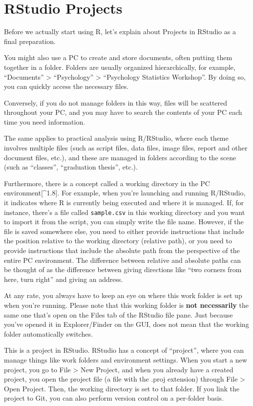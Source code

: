 \documentclass[
  a4paper,
]{book}
\begin{document}
\section{RStudio Projects}\label{rstudio-projects}

Before we actually start using R, let's explain about Projects in
RStudio as a final preparation.

You might also use a PC to create and store documents, often putting
them together in a folder. Folders are usually organized hierarchically,
for example, ``Documents'' \textgreater{} ``Psychology'' \textgreater{}
``Psychology Statistics Workshop''. By doing so, you can quickly access
the necessary files.

Conversely, if you do not manage folders in this way, files will be
scattered throughout your PC, and you may have to search the contents of
your PC each time you need information.

The same applies to practical analysis using R/RStudio, where each theme
involves multiple files (such as script files, data files, image files,
report and other document files, etc.), and these are managed in folders
according to the scene (such as ``classes'', ``graduation thesis'',
etc.).

Furthermore, there is a concept called a working directory in the PC
environment{[}\^{}1.8{]}. For example, when you're launching and running
R/RStudio, it indicates where R is currently being executed and where it
is managed. If, for instance, there's a file called \texttt{sample.csv}
in this working directory and you want to import it from the script, you
can simply write the file name. However, if the file is saved somewhere
else, you need to either provide instructions that include the position
relative to the working directory (relative path), or you need to
provide instructions that include the absolute path from the perspective
of the entire PC environment. The difference between relative and
absolute paths can be thought of as the difference between giving
directions like ``two corners from here, turn right'' and giving an
address.

At any rate, you always have to keep an eye on where this work folder is
set up when you're running. Please note that this working folder is
\textbf{not necessarily} the same one that's open on the Files tab of
the RStudio file pane. Just because you've opened it in Explorer/Finder
on the GUI, does not mean that the working folder automatically
switches.

This is a project in RStudio. RStudio has a concept of ``project'',
where you can manage things like work folders and environment settings.
When you start a new project, you go to File \textgreater{} New Project,
and when you already have a created project, you open the project file
(a file with the .proj extension) through File \textgreater{} Open
Project. Then, the working directory is set to that folder. If you link
the project to Git, you can also perform version control on a per-folder
basis.
\end{document}
